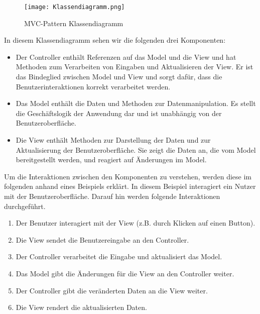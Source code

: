 \begin{figure}[h]
\centering
\texttt{[image: Klassendiagramm.png]}
\caption{MVC-Pattern Klassendiagramm}
\end{figure}

In diesem Klassendiagramm sehen wir die folgenden drei Komponenten:
\newpage
\begin{itemize}
\item Der Controller enthält Referenzen auf das Model und die View und hat Methoden zum Verarbeiten von Eingaben und Aktualisieren der View. Er ist das Bindeglied zwischen Model und View und sorgt dafür, dass die Benutzerinteraktionen korrekt verarbeitet werden.

\item Das Model enthält die Daten und Methoden zur Datenmanipulation. Es stellt die Geschäftslogik der Anwendung dar und ist unabhängig von der Benutzeroberfläche.

\item Die View enthält Methoden zur Darstellung der Daten und zur Aktualisierung der Benutzeroberfläche. Sie zeigt die Daten an, die vom Model bereitgestellt werden, und reagiert auf Änderungen im Model.
\end{itemize}

Um die Interaktionen zwischen den Komponenten zu verstehen, werden diese im folgenden anhand eines Beispiels erklärt. In diesem Beispiel interagiert ein Nutzer mit der Benutzeroberfläche. Darauf hin werden folgende Interaktionen durchgeführt.

\begin{enumerate}
\item Der Benutzer interagiert mit der View (z.B. durch Klicken auf einen Button).

\item Die View sendet die Benutzereingabe an den Controller.

\item Der Controller verarbeitet die Eingabe und aktualisiert das Model.

\item Das Model gibt die Änderungen für die View an den Controller weiter.

\item Der Controller gibt die veränderten Daten an die View weiter.

\item Die View rendert die aktualisierten Daten.
\end{enumerate}

